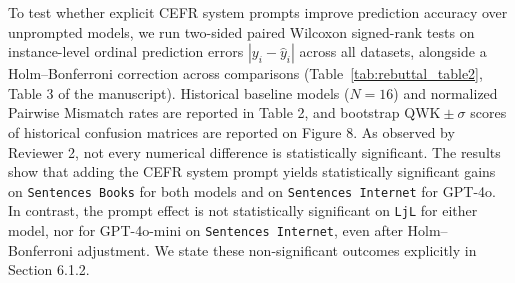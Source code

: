 \documentclass[11pt,a4paper]{article}
\begin{document}
To test whether explicit CEFR system prompts improve prediction accuracy over unprompted models, we run two-sided paired Wilcoxon signed-rank tests on instance-level ordinal prediction errors $|y_i - \hat{y}_i|$ across all datasets, alongside a Holm--Bonferroni correction across comparisons (Table~\ref{tab:rebuttal_table2}, Table 3 of the manuscript). Historical baseline models ($N = 16$) and normalized Pairwise Mismatch rates are reported in Table 2, and bootstrap $\text{QWK} \pm \sigma$ scores of historical confusion matrices are reported on Figure 8. As observed by Reviewer 2, not every numerical difference is statistically significant. The results show that adding the CEFR system prompt yields statistically significant gains on \texttt{Sentences Books} for both models and on \texttt{Sentences Internet} for GPT-4o. In contrast, the prompt effect is not statistically significant on \texttt{LjL} for either model, nor for GPT-4o-mini on \texttt{Sentences Internet}, even after Holm--Bonferroni adjustment. We state these non-significant outcomes explicitly in Section 6.1.2.
\end{document}
